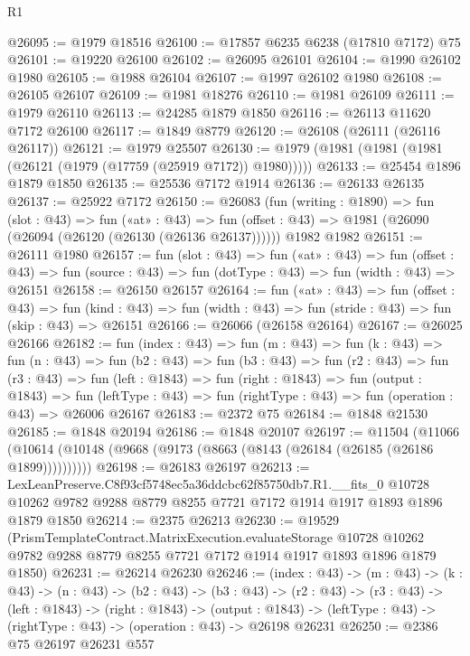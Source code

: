 \begin{lexlean}{R1}
\begin{coremodule}
@26095 := @1979 @18516
@26100 := @17857 @6235 @6238 (@17810 @7172) @75
@26101 := @19220 @26100
@26102 := @26095 @26101
@26104 := @1990 @26102 @1980
@26105 := @1988 @26104
@26107 := @1997 @26102 @1980
@26108 := @26105 @26107
@26109 := @1981 @18276
@26110 := @1981 @26109
@26111 := @1979 @26110
@26113 := @24285 @1879 @1850
@26116 := @26113 @11620 @7172 @26100
@26117 := @1849 @8779
@26120 := @26108 (@26111 (@26116 @26117))
@26121 := @1979 @25507
@26130 := @1979 (@1981 (@1981 (@1981 (@26121 (@1979 (@17759 (@25919 @7172)) @1980)))))
@26133 := @25454 @1896 @1879 @1850
@26135 := @25536 @7172 @1914
@26136 := @26133 @26135
@26137 := @25922 @7172
@26150 := @26083
    (fun (writing : @1890) =>
    fun (slot : @43) =>
    fun («at» : @43) =>
    fun (offset : @43) => @1981 (@26090 (@26094 (@26120 (@26130 (@26136 @26137))))))
    @1982
    @1982
@26151 := @26111 @1980
@26157 := fun (slot : @43) =>
  fun («at» : @43) =>
  fun (offset : @43) => fun (source : @43) => fun (dotType : @43) => fun (width : @43) => @26151
@26158 := @26150 @26157
@26164 := fun («at» : @43) =>
  fun (offset : @43) =>
  fun (kind : @43) => fun (width : @43) => fun (stride : @43) => fun (skip : @43) => @26151
@26166 := @26066 (@26158 @26164)
@26167 := @26025 @26166
@26182 := fun (index : @43) =>
  fun (m : @43) =>
  fun (k : @43) =>
  fun (n : @43) =>
  fun (b2 : @43) =>
  fun (b3 : @43) =>
  fun (r2 : @43) =>
  fun (r3 : @43) =>
  fun (left : @1843) =>
  fun (right : @1843) =>
  fun (output : @1843) =>
  fun (leftType : @43) => fun (rightType : @43) => fun (operation : @43) => @26006 @26167
@26183 := @2372 @75
@26184 := @1848 @21530
@26185 := @1848 @20194
@26186 := @1848 @20107
@26197 := @11504
    (@11066 (@10614 (@10148 (@9668 (@9173 (@8663 (@8143 (@26184 (@26185 (@26186 @1899))))))))))
@26198 := @26183 @26197
@26213 := LexLeanPreserve.C8f93cf5748ec5a36ddcbc62f85750db7.R1.__fits_0
    @10728
    @10262
    @9782
    @9288
    @8779
    @8255
    @7721
    @7172
    @1914
    @1917
    @1893
    @1896
    @1879
    @1850
@26214 := @2375 @26213
@26230 := @19529
    (PrismTemplateContract.MatrixExecution.evaluateStorage
      @10728
      @10262
      @9782
      @9288
      @8779
      @8255
      @7721
      @7172
      @1914
      @1917
      @1893
      @1896
      @1879
      @1850)
@26231 := @26214 @26230
@26246 := (index : @43) ->
  (m : @43) ->
  (k : @43) ->
  (n : @43) ->
  (b2 : @43) ->
  (b3 : @43) ->
  (r2 : @43) ->
  (r3 : @43) ->
  (left : @1843) ->
  (right : @1843) ->
  (output : @1843) -> (leftType : @43) -> (rightType : @43) -> (operation : @43) -> @26198 @26231
@26250 := @2386 @75 @26197 @26231 @557

\end{coremodule}
\end{lexlean}
